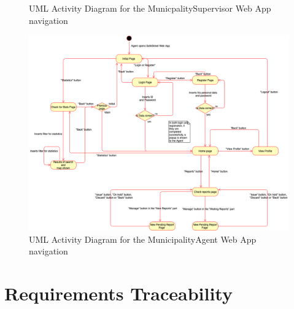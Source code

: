 \documentclass[a4paper]{report}
\begin{document}
{\begin{landscape}
\begin{figure}[hp]
\caption{UML Activity Diagram for the MunicpalitySupervisor Web App navigation}
\label{fig:SupWebApp-activity}
\end{figure}

\begin{figure}[hp]
\includegraphics[angle=0, scale=0.50]{Activity_diagram_WebApp}
\caption{UML Activity Diagram for the MunicipalityAgent Web App navigation}
\label{fig:AgentWebApp-activity}
\end{figure}
\end{landscape}
}

\chapter{Requirements Traceability}
\end{document}
